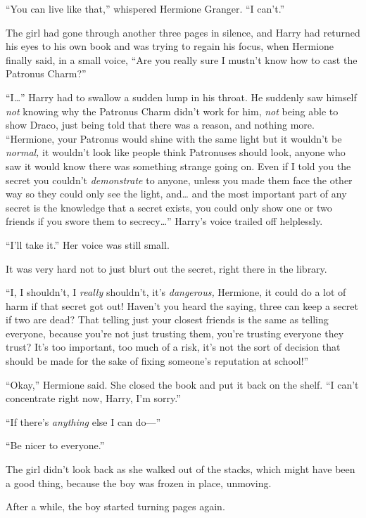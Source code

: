 ``You can live like that,'' whispered Hermione Granger. ``I can't.''

The girl had gone through another three pages in silence, and Harry had
returned his eyes to his own book and was trying to regain his focus,
when Hermione finally said, in a small voice, ``Are you really sure I
mustn't know how to cast the Patronus Charm?''

``I\ldots{}'' Harry had to swallow a sudden lump in his throat. He
suddenly saw himself \emph{not} knowing why the Patronus Charm didn't
work for him, \emph{not} being able to show Draco, just being told that
there was a reason, and nothing more. ``Hermione, your Patronus would
shine with the same light but it wouldn't be \emph{normal,} it wouldn't
look like people think Patronuses should look, anyone who saw it would
know there was something strange going on. Even if I told you the secret
you couldn't \emph{demonstrate} to anyone, unless you made them face the
other way so they could only see the light, and\ldots{} and the most
important part of any secret is the knowledge that a secret exists, you
could only show one or two friends if you swore them to
secrecy\ldots{}'' Harry's voice trailed off helplessly.

``I'll take it.'' Her voice was still small.

It was very hard not to just blurt out the secret, right there in the
library.

``I, I shouldn't, I \emph{really} shouldn't, it's \emph{dangerous,}
Hermione, it could do a lot of harm if that secret got out! Haven't you
heard the saying, three can keep a secret if two are dead? That telling
just your closest friends is the same as telling everyone, because
you're not just trusting them, you're trusting everyone they trust? It's
too important, too much of a risk, it's not the sort of decision that
should be made for the sake of fixing someone's reputation at school!''

``Okay,'' Hermione said. She closed the book and put it back on the
shelf. ``I can't concentrate right now, Harry, I'm sorry.''

``If there's \emph{anything} else I can do---''

``Be nicer to everyone.''

The girl didn't look back as she walked out of the stacks, which might
have been a good thing, because the boy was frozen in place, unmoving.

After a while, the boy started turning pages again.

